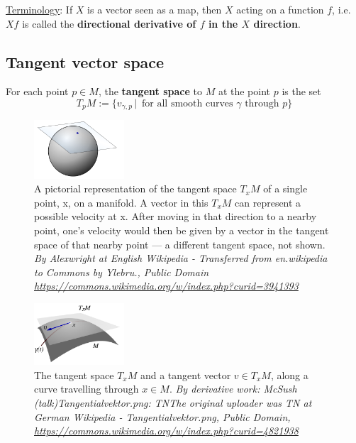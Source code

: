\underline{Terminology}: If $X$ is a vector seen as a map, then $X$ acting on a function $f$, i.e. $Xf$ is called the \textbf{directional derivative of $f$ in the $X$ direction}.

\subsection{Tangent vector space}
\begin{definition}
For each point $p \in M$, the \textbf{tangent space} to $M$ at the point $p$ is the set \\
\begin{equation}\label{Eq:L5_defTangentSpace}
T_p M := \lbrace v_{\gamma, p} \, | \, \text{ for all smooth curves } \gamma \text{ through } p \rbrace
\end{equation}
\end{definition}

\begin{figure}
\label{fig:L5_TangentPlane}
  \centering
    \includegraphics[width=0.3\textwidth]{5_Tangent_plane}
    \caption{A pictorial representation of the tangent space $T_xM$ of a single point, x, on a manifold. A vector in this $T_xM$ can represent a possible velocity at x. After moving in that direction to a nearby point, one's velocity would then be given by a vector in the tangent space of that nearby point — a different tangent space, not shown. \textit{By Alexwright at English Wikipedia - Transferred from en.wikipedia to Commons by Ylebru., Public Domain \url{https://commons.wikimedia.org/w/index.php?curid=3941393}}}
\end{figure}

\begin{figure}
\label{fig:L5_TangentVector}
  \centering
    \includegraphics[width=0.3\textwidth]{5_Tangential_vector}
    \caption{The tangent space $T_xM$ and a tangent vector $v \in T_xM$, along a curve travelling through $x \in M$. \textit{By derivative work: McSush (talk)Tangentialvektor.png: TNThe original uploader was TN at German Wikipedia - Tangentialvektor.png, Public Domain, \url{https://commons.wikimedia.org/w/index.php?curid=4821938}}}
\end{figure}

